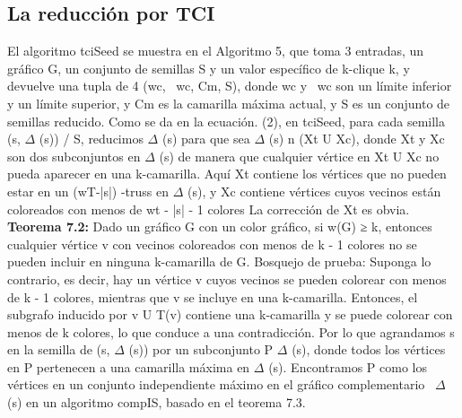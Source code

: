 \subsection{La reducción por TCI}
El algoritmo tciSeed se muestra en el Algoritmo 5, que toma 3 entradas, un gráfico G, un conjunto de semillas S y un valor específico de k-clique k, y devuelve una tupla de 4 (wc, ~wc, Cm, S), donde wc y ~wc son un límite inferior y un límite superior, y Cm es la camarilla máxima actual, y S es un conjunto de semillas reducido. Como se da en la ecuación. (2), en tciSeed, para cada semilla (s, \begin{math}\Delta\end{math} (s)) / S, reducimos \begin{math}\Delta\end{math} (s) para que sea \begin{math}\Delta\end{math} (s) n (Xt U Xc), donde Xt y Xc son dos subconjuntos en \begin{math}\Delta\end{math} (s) de manera que cualquier vértice en Xt U Xc no pueda aparecer en una k-camarilla. Aquí Xt contiene los vértices que no pueden estar en un (wT-|s|) -truss en \begin{math}\Delta\end{math} (s), y Xc contiene vértices cuyos vecinos están coloreados con menos de wt - |s| - 1 colores La corrección de Xt es obvia.
\\
\textbf{Teorema 7.2:} Dado un gráfico G con un color gráfico, si w(G) ≥ k, entonces cualquier vértice v con vecinos coloreados con menos de k - 1 colores no se pueden incluir en ninguna k-camarilla de G.
Bosquejo de prueba: Suponga lo contrario, es decir, hay un vértice v cuyos vecinos se pueden colorear con menos de k - 1 colores, mientras que v se incluye en una k-camarilla. Entonces, el subgrafo inducido por {v} U T(v) contiene una k-camarilla y se puede colorear con menos de k colores, lo que conduce a una contradicción. Por lo que agrandamos s en la semilla de (s, \begin{math}\Delta\end{math} (s)) por un subconjunto P \begin{math}\Delta\end{math} (s), donde todos los vértices en P pertenecen a una camarilla máxima en \begin{math}\Delta\end{math} (s). Encontramos P como los vértices en un conjunto independiente máximo en el gráfico complementario ~\begin{math}\Delta\end{math}(s) en un algoritmo compIS, basado en el teorema 7.3.
